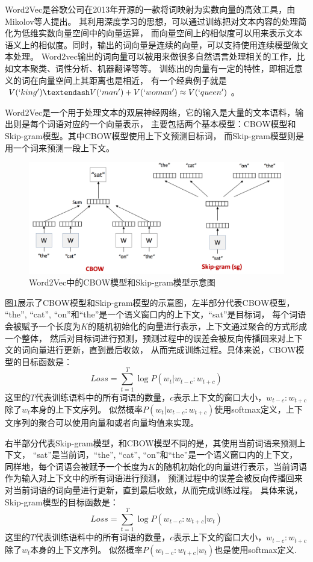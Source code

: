Word2Vec是谷歌公司在2013年开源的一款将词映射为实数向量的高效工具，由Mikolov等人\parencite{mikolov2013efficient}提出。
其利用深度学习的思想，可以通过训练把对文本内容的处理简化为低维实数向量空间中的向量运算，
而向量空间上的相似度可以用来表示文本语义上的相似度。同时，输出的词向量是连续的向量，可以支持使用连续模型做文本处理。
Word2vec输出的词向量可以被用来做很多自然语言处理相关的工作，比如文本聚类、词性分析、机器翻译等等。
训练出的向量有一定的特性，即相近意义的词在向量空间上其距离也是相近，
有一个经典例子就是$V(`king') – V(`man') + V(`woman') \approx V(`queen')$。

Word2Vec是一个用于处理文本的双层神经网络，它的输入是大量的文本语料，输出则是每个词语对应的一个向量表示，
主要包括两个基本模型：CBOW模型和Skip-gram模型。其中CBOW模型使用上下文预测目标词，
而Skip-gram模型则是用一个词来预测一段上下文。

\begin{figure}[htbp]
\centering
\includegraphics[scale=0.4]{images/w2v.png}
\caption{Word2Vec中的CBOW模型和Skip-gram模型示意图}
\label{fig:word2vec}
\end{figure}

图\ref{fig:word2vec}展示了CBOW模型和Skip-gram模型的示意图，左半部分代表CBOW模型，
``the'', ``cat'', ``on''和``the''是一个语义窗口内的上下文，``sat''是目标词，
每个词语会被赋予一个长度为$K$的随机初始化的向量进行表示，上下文通过聚合的方式形成一个整体，
然后对目标词进行预测，预测过程中的误差会被反向传播回来对上下文的词向量进行更新，直到最后收敛，
从而完成训练过程。具体来说，CBOW模型的目标函数是：
\begin{equation}
Loss = \sum_{t=1}^T {\log P(w_t| w_{t-c} : w_{t+c}) }
\end{equation}
这里的$T$代表训练语料中的所有词语的数量，$c$表示上下文的窗口大小，$w_{t-c} : w_{t+c}$除了$w_t$本身的上下文序列。
似然概率$P(w_t| w_{t-c} : w_{t+c})$使用softmax定义，上下文序列的聚合可以使用向量和或者向量均值来实现。

右半部分代表Skip-gram模型，和CBOW模型不同的是，其使用当前词语来预测上下文，
``sat''是当前词，``the'', ``cat'', ``on''和``the''是一个语义窗口内的上下文，
同样地，每个词语会被赋予一个长度为$K$的随机初始化的向量进行表示，当前词语作为输入对上下文中的所有词语进行预测，
预测过程中的误差会被反向传播回来对当前词语的词向量进行更新，直到最后收敛，从而完成训练过程。
具体来说，Skip-gram模型的目标函数是：
\begin{equation}
Loss = \sum_{t=1}^T {\log P(w_{t-c} : w_{t+c} | w_t) }
\end{equation}
这里的$T$代表训练语料中的所有词语的数量，$c$表示上下文的窗口大小，$w_{t-c} : w_{t+c}$除了$w_t$本身的上下文序列。
似然概率$P(w_{t-c} : w_{t+c} | w_t)$也是使用softmax定义.

